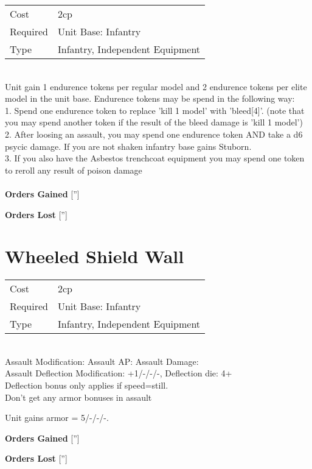 \begin{tabular}{ll}
    Cost & 2cp \\
    Required & Unit Base: Infantry\\
    Type & Infantry, Independent Equipment\\
\end{tabular}
\ \\
Unit gain 1 endurence tokens per regular model  and 2 endurence tokens per elite model in the unit base. Endurence tokens may be spend in the following way: \\ 1. Spend one endurence token to replace 'kill 1 model' with 'bleed[4]'. (note that you may spend another token if the result of the bleed damage is 'kill 1 model') \\ 2. After loosing an assault, you may spend one endurence token AND take a d6 psycic damage. If you are not shaken infantry base gains Stuborn. \\ 3. If you also have the Asbestos trenchcoat equipment you may spend one token to reroll any result of poison damage \\

\ \\

{\bf Orders Gained}
['']

{\bf Orders Lost}
['']
\section{ Wheeled Shield Wall }

\begin{tabular}{ll}
    Cost & 2cp \\
    Required & Unit Base: Infantry\\
    Type & Infantry, Independent Equipment\\
\end{tabular}
\ \\
Assault Modification:  Assault AP:  Assault Damage: \\
Assault Deflection Modification: +1/-/-/-, Deflection die: 4+ \\
Deflection bonus only applies if speed=still. \\ Don't get any armor bonuses in assault

Unit gains armor = 5/-/-/-. 

{\bf Orders Gained}
['']

{\bf Orders Lost}
['']

